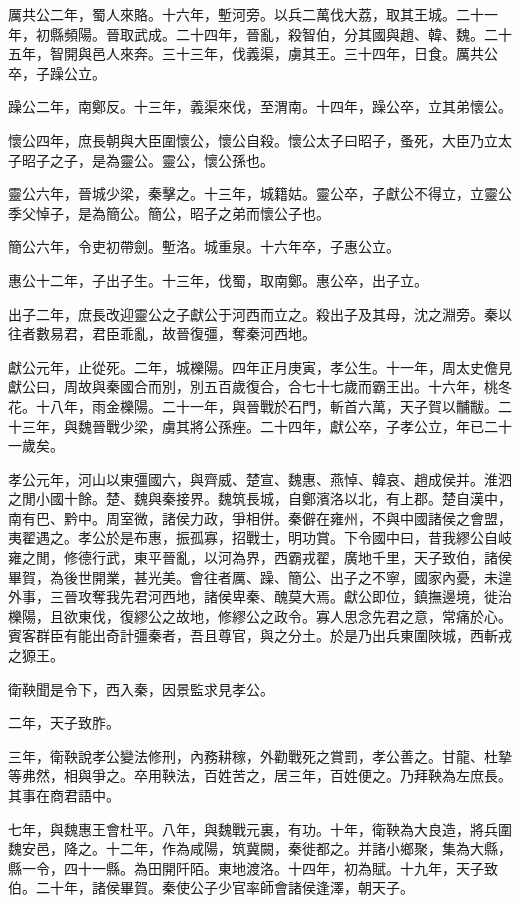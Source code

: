 厲共公二年，蜀人來賂。十六年，塹河旁。以兵二萬伐大荔，取其王城。二十一年，初縣頻陽。晉取武成。二十四年，晉亂，殺智伯，分其國與趙、韓、魏。二十五年，智開與邑人來奔。三十三年，伐義渠，虜其王。三十四年，日食。厲共公卒，子躁公立。

躁公二年，南鄭反。十三年，義渠來伐，至渭南。十四年，躁公卒，立其弟懷公。

懷公四年，庶長朝與大臣圍懷公，懷公自殺。懷公太子曰昭子，蚤死，大臣乃立太子昭子之子，是為靈公。靈公，懷公孫也。

靈公六年，晉城少梁，秦擊之。十三年，城籍姑。靈公卒，子獻公不得立，立靈公季父悼子，是為簡公。簡公，昭子之弟而懷公子也。

簡公六年，令吏初帶劍。塹洛。城重泉。十六年卒，子惠公立。

惠公十二年，子出子生。十三年，伐蜀，取南鄭。惠公卒，出子立。

出子二年，庶長改迎靈公之子獻公于河西而立之。殺出子及其母，沈之淵旁。秦以往者數易君，君臣乖亂，故晉復彊，奪秦河西地。

獻公元年，止從死。二年，城櫟陽。四年正月庚寅，孝公生。十一年，周太史儋見獻公曰，周故與秦國合而別，別五百歲復合，合七十七歲而霸王出。十六年，桃冬花。十八年，雨金櫟陽。二十一年，與晉戰於石門，斬首六萬，天子賀以黼黻。二十三年，與魏晉戰少梁，虜其將公孫痤。二十四年，獻公卒，子孝公立，年已二十一歲矣。

孝公元年，河山以東彊國六，與齊威、楚宣、魏惠、燕悼、韓哀、趙成侯并。淮泗之閒小國十餘。楚、魏與秦接界。魏筑長城，自鄭濱洛以北，有上郡。楚自漢中，南有巴、黔中。周室微，諸侯力政，爭相併。秦僻在雍州，不與中國諸侯之會盟，夷翟遇之。孝公於是布惠，振孤寡，招戰士，明功賞。下令國中曰，昔我繆公自岐雍之閒，修德行武，東平晉亂，以河為界，西霸戎翟，廣地千里，天子致伯，諸侯畢賀，為後世開業，甚光美。會往者厲、躁、簡公、出子之不寧，國家內憂，未遑外事，三晉攻奪我先君河西地，諸侯卑秦、醜莫大焉。獻公即位，鎮撫邊境，徙治櫟陽，且欲東伐，復繆公之故地，修繆公之政令。寡人思念先君之意，常痛於心。賓客群臣有能出奇計彊秦者，吾且尊官，與之分土。於是乃出兵東圍陜城，西斬戎之獂王。

衛鞅聞是令下，西入秦，因景監求見孝公。

二年，天子致胙。

三年，衛鞅說孝公變法修刑，內務耕稼，外勸戰死之賞罰，孝公善之。甘龍、杜摯等弗然，相與爭之。卒用鞅法，百姓苦之，居三年，百姓便之。乃拜鞅為左庶長。其事在商君語中。

七年，與魏惠王會杜平。八年，與魏戰元裏，有功。十年，衛鞅為大良造，將兵圍魏安邑，降之。十二年，作為咸陽，筑冀闕，秦徙都之。并諸小鄉聚，集為大縣，縣一令，四十一縣。為田開阡陌。東地渡洛。十四年，初為賦。十九年，天子致伯。二十年，諸侯畢賀。秦使公子少官率師會諸侯逢澤，朝天子。

